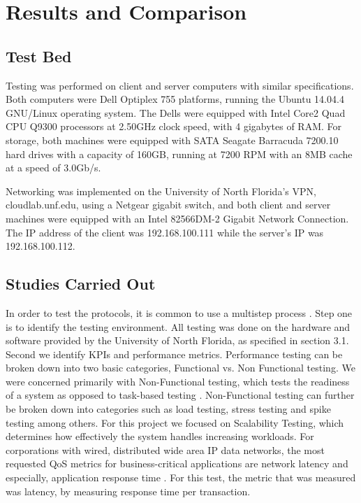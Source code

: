 \section{Results and Comparison}

\subsection{Test Bed}

Testing was performed on client and server computers with similar specifications. 
Both computers were Dell Optiplex 755 platforms, running the Ubuntu 14.04.4 GNU/Linux operating system. 
The Dells were equipped with Intel Core2 Quad CPU Q9300 processors at 2.50GHz clock speed, with 4 gigabytes of RAM. 
For storage, both machines were equipped with SATA Seagate Barracuda 7200.10 hard drives with a capacity of 160GB, running at 7200 RPM with an 8MB cache at a speed of 3.0Gb/s.

Networking was implemented on the University of North Florida’s VPN, cloudlab.unf.edu, using a Netgear gigabit switch, and both client and server machines were equipped with an Intel 82566DM-2 Gigabit Network Connection. 
The IP address of the client was 192.168.100.111 while the server’s IP was 192.168.100.112.

\subsection{Studies Carried Out}

In order to test the protocols, it is common to use a multistep process 
\cite{stackify}.
Step one is to identify the testing environment. 
All testing was done on the hardware and software provided by the University of North Florida, as specified in section 3.1. 
Second we identify KPIs and performance metrics. 
Performance testing can be broken down into two basic categories, Functional vs. Non Functional testing. 
We were concerned primarily with Non-Functional testing, which tests the readiness of a system as opposed to task-based testing 
\cite{reqtest}.
Non-Functional testing can further be broken down into categories such as load testing, stress testing and spike testing among others. 
For this project we focused on Scalability Testing, which determines how effectively the system handles increasing workloads. 
For corporations with wired, distributed wide area IP data networks, the most requested QoS metrics for business-critical applications are network latency and especially, application response time
\cite{morreale}.
For this test, the metric that was measured was latency, by measuring response time per transaction.

